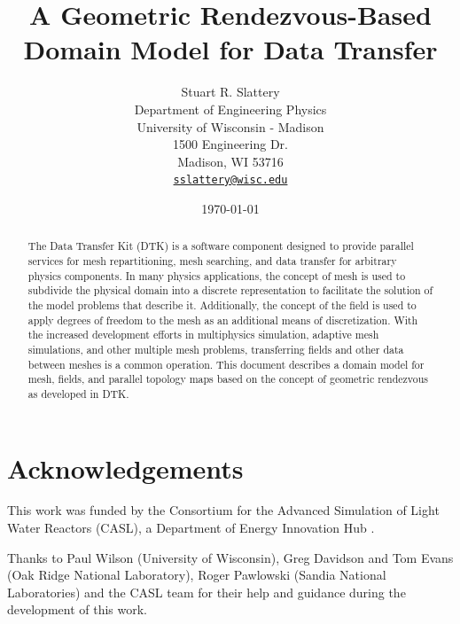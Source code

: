 \documentclass[letterpaper,12pt]{article}
\author{
  Stuart R. Slattery\\
  Department of Engineering Physics\\
  University of Wisconsin - Madison\\
  1500 Engineering Dr.\\
  Madison, WI 53716\\
  \href{mailto:sslattery@wisc.edu}{\texttt{sslattery@wisc.edu}}
}
\date{\today}
\title{A Geometric Rendezvous-Based Domain Model for Data Transfer}
\begin{document}
\maketitle

\newpage

\begin{abstract}
  The Data Transfer Kit (DTK) is a software component designed to
  provide parallel services for mesh repartitioning, mesh searching,
  and data transfer for arbitrary physics components. In many physics
  applications, the concept of mesh is used to subdivide the physical
  domain into a discrete representation to facilitate the solution of
  the model problems that describe it. Additionally, the concept of
  the field is used to apply degrees of freedom to the mesh as an
  additional means of discretization. With the increased development
  efforts in multiphysics simulation, adaptive mesh simulations, and
  other multiple mesh problems, transferring fields and other data
  between meshes is a common operation. This document describes a
  domain model for mesh, fields, and parallel topology maps based on
  the concept of geometric rendezvous as developed in DTK.
\end{abstract}

\newpage

\section*{Acknowledgements}
This work was funded by the Consortium for the Advanced Simulation of
Light Water Reactors (CASL), a Department of Energy Innovation Hub
\cite{CASL_web}.

Thanks to Paul Wilson (University of Wisconsin), Greg Davidson and Tom
Evans (Oak Ridge National Laboratory), Roger Pawlowski (Sandia
National Laboratories) and the CASL team for their help and guidance
during the development of this work.

\newpage

\tableofcontents
\clearpage
\listoffigures
\clearpage
\newpage

\end{document}
